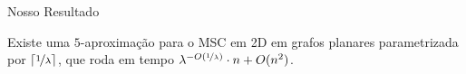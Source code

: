 \begin{frame}{Nosso Resultado}
  \begin{cor}
    Existe uma $5$-aproximação para o MSC em 2D em grafos planares parametrizada por $\lceil \nicefrac{1}{\lambda} \rceil$, que roda em tempo $\lambda^{-O(\nicefrac{1}{\lambda})} \cdot n + O(n^2)$.
  \end{cor}
\end{frame}
